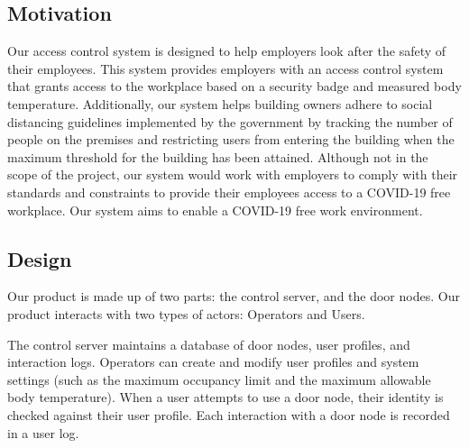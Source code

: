 
\subsection{Motivation}

Our access control system is designed to help employers look after the safety
of their employees.  This system provides employers with an access control
system that grants access to the workplace based on a security badge and
measured body temperature.  Additionally, our system helps building owners
adhere to social distancing guidelines implemented by the government by
tracking the number of people on the premises and restricting users from
entering the building when the maximum threshold for the building has been
attained.  Although not in the scope of the project, our system would work with
employers to comply with their standards and constraints to provide their
employees access to a COVID-19 free workplace.  Our system aims to enable a
COVID-19 free work environment.


\subsection{Design}

Our product is made up of two parts: the control server, and the door nodes.
Our product interacts with two types of actors: Operators and Users.


The control server maintains a database of door nodes, user profiles, and
interaction logs.  Operators can create and modify user profiles and system
settings (such as the maximum occupancy limit and the maximum allowable body
temperature).  When a user attempts to use a door node, their identity is
checked against their user profile.  Each interaction with a door node is
recorded in a user log.
